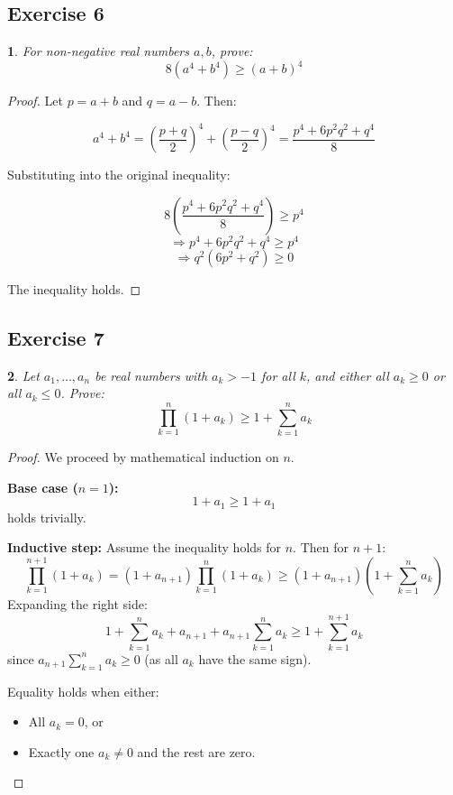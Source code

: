 \documentclass[12pt]{article}
\newtheorem{problem}{}
\begin{document}
\subsection*{Exercise 6}
\begin{problem}
For non-negative real numbers \( a,b \), prove:
\[ 8(a^4 + b^4) \geq (a + b)^4 \]
\end{problem}

\begin{proof}
Let \( p = a + b \) and \( q = a - b \). Then:

\[ a^4 + b^4 = \left(\frac{p+q}{2}\right)^4 + \left(\frac{p-q}{2}\right)^4 = \frac{p^4 + 6p^2q^2 + q^4}{8} \]

Substituting into the original inequality:

\[ 8\left(\frac{p^4 + 6p^2q^2 + q^4}{8}\right) \geq p^4 \]
\[ \Rightarrow p^4 + 6p^2q^2 + q^4 \geq p^4 \]
\[ \Rightarrow q^2(6p^2 + q^2) \geq 0 \]

The inequality holds. 
\end{proof}

\subsection*{Exercise 7}
\begin{problem}
Let \( a_1, \ldots, a_n \) be real numbers with \( a_k > -1 \) for all \( k \), and either all \( a_k \geq 0 \) or all \( a_k \leq 0 \). Prove:
\[ \prod_{k=1}^n (1 + a_k) \geq 1 + \sum_{k=1}^n a_k \]
\end{problem}

\begin{proof}
We proceed by mathematical induction on \( n \).

\textbf{Base case (\( n = 1 \)):}
\[ 1 + a_1 \geq 1 + a_1 \]
holds trivially.

\textbf{Inductive step:} Assume the inequality holds for \( n \). Then for \( n+1 \):
\[
\prod_{k=1}^{n+1} (1 + a_k) = (1 + a_{n+1})\prod_{k=1}^n (1 + a_k) \geq (1 + a_{n+1})\left(1 + \sum_{k=1}^n a_k\right)
\]
Expanding the right side:
\[
1 + \sum_{k=1}^n a_k + a_{n+1} + a_{n+1}\sum_{k=1}^n a_k \geq 1 + \sum_{k=1}^{n+1} a_k
\]
since \( a_{n+1}\sum_{k=1}^n a_k \geq 0 \) (as all \( a_k \) have the same sign).

Equality holds when either:
\begin{itemize}
\item All \( a_k = 0 \), or
\item Exactly one \( a_k \neq 0 \) and the rest are zero.
\end{itemize}
\end{proof}
\end{document}
